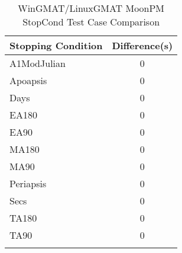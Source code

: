 \begin{table}[htbp!]
\centering
\caption{ WinGMAT/LinuxGMAT MoonPM StopCond Test Case Comparison}
      \begin{tabular}{lc}
      \hline\hline
          Stopping Condition & Difference(s) \\
         \hline
         A1ModJulian & 0 \\
         Apoapsis & 0 \\
         Days & 0 \\
         EA180 & 0 \\
         EA90 & 0 \\
         MA180 & 0 \\
         MA90 & 0 \\
         Periapsis & 0 \\
         Secs & 0 \\
         TA180 & 0 \\
         TA90 & 0 \\
      \hline\hline
      \label{Table: WinGMAT-LinuxGMAT MoonPM StopCond Table} 
\end{tabular}
\end{table}
